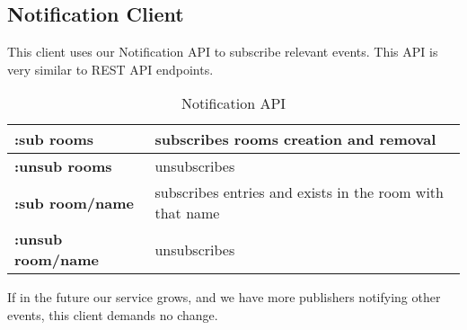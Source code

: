 
\subsection{Notification Client}
This client uses our Notification API to subscribe relevant events. This API is very similar to REST API endpoints. 

\begin{table}[!h]
\centering
\begin{tabular}{l|l}
\hline
\textbf{:sub rooms} & subscribes rooms creation and removal\\
\hline
\textbf{:unsub rooms} & unsubscribes\\
\hline
\textbf{:sub room/name} & subscribes entries and exists in the room with that name\\
\hline
\textbf{:unsub room/name} & unsubscribes\\
\hline
\end{tabular}
\caption{Notification API}
\end{table}

If in the future our service grows, and we have more publishers notifying other events,
this client demands no change. 